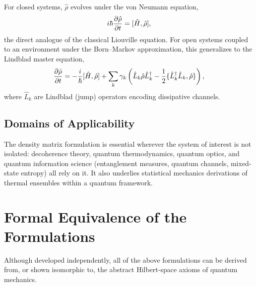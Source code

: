 \documentclass[11pt,a4paper]{article}
\begin{document}
For closed systems, $\hat\rho$ evolves under the von Neumann equation,
\begin{equation}
    i\hbar \pdv{\hat{\rho}}{t} = [\hat{H}, \hat{\rho}],
\end{equation}
the direct analogue of the classical Liouville equation. For open systems coupled to an environment under the Born--Markov approximation, this generalizes to the Lindblad master equation,
\begin{equation}
    \pdv{\hat{\rho}}{t} = -\frac{i}{\hbar}[\hat{H}, \hat{\rho}] + \sum_k \gamma_k \left(\hat{L}_k \hat{\rho} \hat{L}_k^\dagger - \frac{1}{2}\{\hat{L}_k^\dagger \hat{L}_k, \hat{\rho}\}\right),
\end{equation}
where $\hat{L}_k$ are Lindblad (jump) operators encoding dissipative channels.

\subsection{Domains of Applicability}

The density matrix formulation is essential wherever the system of interest is not isolated: decoherence theory, quantum thermodynamics, quantum optics, and quantum information science (entanglement measures, quantum channels, mixed-state entropy) all rely on it. It also underlies statistical mechanics derivations of thermal ensembles within a quantum framework.

\section{Formal Equivalence of the Formulations}

Although developed independently, all of the above formulations can be derived from, or shown isomorphic to, the abstract Hilbert-space axioms of quantum mechanics.
\end{document}
